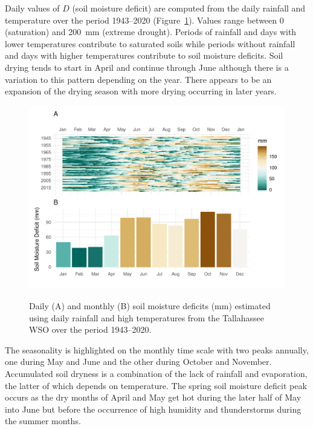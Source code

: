 \documentclass[12pt]{iopart}
\begin{document}
Daily values of $D$ (soil moisture deficit) are computed from the daily rainfall and temperature over the period 1943--2020 (Figure~\ref{DailyMonthlyDeficits}). Values range between 0 (saturation) and 200~mm (extreme drought). Periods of rainfall and days with lower temperatures contribute to saturated soils while periods without rainfall and days with higher temperatures contribute to soil moisture deficits. Soil drying tends to start in April and continue through June although there is a variation to this pattern depending on the year. There appears to be an expansion of the drying season with more drying occurring in later years.
\begin{figure}[t]
\noindent\includegraphics[scale=.85,trim=0in 0in 0in 0in,clip]{DailyMonthlyDeficits.pdf}\\
\vspace{-.25in}
\caption{Daily (A) and monthly (B) soil moisture deficits (mm) estimated using daily rainfall and high temperatures from the Tallahassee WSO over the period 1943--2020.}
\label{DailyMonthlyDeficits}
\end{figure}

The seasonality is highlighted on the monthly time scale with two peaks annually, one during May and June and the other during October and November. Accumulated soil dryness is a combination of the lack of rainfall and evaporation, the latter of which depends on temperature. The spring soil moisture deficit peak occurs as the dry months of April and May get hot during the later half of May into June but before the occurrence of high humidity and thunderstorms during the summer months.
\end{document}
